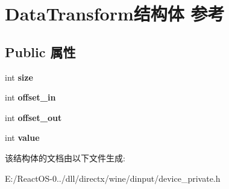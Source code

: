 \hypertarget{struct_data_transform}{}\section{Data\+Transform结构体 参考}
\label{struct_data_transform}
\subsection*{Public 属性}
\begin{DoxyCompactItemize}
\item 
\mbox{\label{struct_data_transform_af7eb6a434901855497cf7e5768795ace}} 
int {\bfseries size}
\item 
\mbox{\label{struct_data_transform_a5c6dbb549cfc54220d5f63e937191bcd}} 
int {\bfseries offset\+\_\+in}
\item 
\mbox{\label{struct_data_transform_aac0af6f29b985361e402b48bbd91e3e5}} 
int {\bfseries offset\+\_\+out}
\item 
\mbox{\label{struct_data_transform_a6374452cb8247d60cd9f468f0b986a60}} 
int {\bfseries value}
\end{DoxyCompactItemize}


该结构体的文档由以下文件生成\+:\begin{DoxyCompactItemize}
\item 
E\+:/\+React\+O\+S-\/0../dll/directx/wine/dinput/device\+\_\+private.\+h\end{DoxyCompactItemize}
